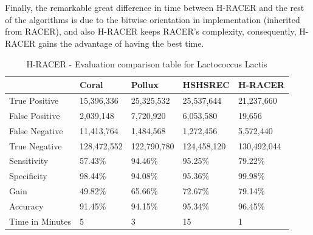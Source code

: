 \documentclass[12pt,openany]{llncs}
\newcommand{\TBstrut}{{\rule{0pt}{7ex}}{\rule[2ex]{0pt}{0pt}}} %
\begin{document}
\\\\ 
Finally, the remarkable great difference in time between H-RACER and the rest of the algorithms is due to the bitwise orientation in implementation (inherited from RACER), and also H-RACER keeps RACER's complexity, consequently, H-RACER gains the advantage of having the best time. 
\newpage
\begin{longtable}{|m{33mm}|m{20mm}|m{20mm}|m{20mm}|m{20mm}|}
	    \caption{\label{tab:eval-1}H-RACER - Evaluation comparison table for Lactococcus Lactis}\\
        \hline
           & Coral & Pollux & HSHSREC & H-RACER\cellcolor{DarkGray} \TBstrut\\ %
        \hline
           True Positive & 15,396,336 &  25,325,532 & 25,537,644 & 21,237,660\cellcolor{LightGray} \TBstrut\\ %
        \hline
           False Positive & 2,039,148 &  7,720,920 & 6,053,580 & 19,656\cellcolor{LightGray} \TBstrut\\ %
        \hline
           False Negative & 11,413,764 & 1,484,568 & 1,272,456 & 5,572,440\cellcolor{LightGray} \TBstrut\\ %
        \hline
           True Negative & 128,472,552 & 122,790,780 & 124,458,120 & 130,492,044\cellcolor{LightGray} \TBstrut\\ %
        \hline
           Sensitivity & 57.43\% & 94.46\% & 95.25\% & 79.22\%\cellcolor{LightGray} \TBstrut\\ %
        \hline
           Specificity & 98.44\% & 94.08\% & 95.36\% & 99.98\%\cellcolor{LightGray} \TBstrut\\ %
        \hline
           Gain & 49.82\% & 65.66\% & 72.67\% & 79.14\%\cellcolor{LightGray} \TBstrut\\ %
        \hline
           Accuracy & 91.45\% & 94.15\% & 95.34\% & 96.45\%\cellcolor{LightGray} \TBstrut\\ %
        \hline
           Time in Minutes& 5 & 3 & 15 & 1\cellcolor{LightGray} \TBstrut\\ %
        \hline
\end{longtable}
\newpage
\end{document}
